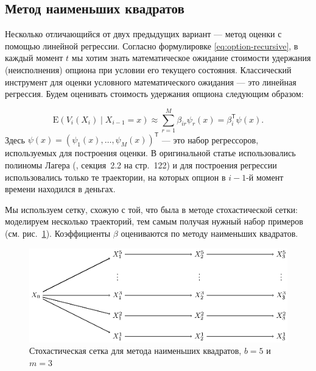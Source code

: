 \documentclass[specialist,
               substylefile = ../spbu.rtx,
               subf,href,colorlinks=true, 12pt]{disser}
\newcommand{\E}{\mathrm{E}}
\begin{document}

\subsection{Метод наименьших квадратов} %
\label{sub:least_squares}

Несколько отличающийся от двух предыдущих вариант --- метод оценки с помощью линейной регрессии. Согласно формулировке \eqref{eq:option-recursive}, в каждый момент $t$ мы хотим знать математическое ожидание стоимости удержания (неисполнения) опциона при условии его текущего состояния. Классический инструмент для оценки условного математического ожидания --- это линейная регрессия. Будем оценивать стоимость удержания опциона следующим образом:

\begin{equation}\label{eq:lsm_continuation}
\E\left(V_i(X_i)\middle\vert X_{i-1} = x\right) \approx \sum_{r=1}^M \beta_{ir} \psi_r(x) = \beta_i^\mathsf{T}\psi(x).
\end{equation}
Здесь $\psi(x) = \left(\psi_1(x), \dots, \psi_M(x)\right)^\mathsf{T}$ --- это набор регрессоров, используемых для построения оценки. В оригинальной статье использовались полиномы Лагера (\cite{Longstaff2001}, секция~2.2 на стр.~122) и для построения регрессии использовались только те траектории, на которых опцион в $i-1$-й момент времени находился в деньгах.

Мы используем сетку, схожую с той, что была в методе стохастической сетки: моделируем несколько траекторий, тем самым получая нужный набор примеров (см. рис.~\ref{fig:least_squares}). Коэффициенты $\beta$ оцениваются по методу наименьших квадратов. 

\begin{figure}[t]
    \centering
	\includegraphics{stohastic_mesh_vector_phase_0.eps}
	\caption{Стохастическая сетка для метода наименьших квадратов, $b = 5$ и $m = 3$}
	\label{fig:least_squares}
\end{figure}
\end{document}
